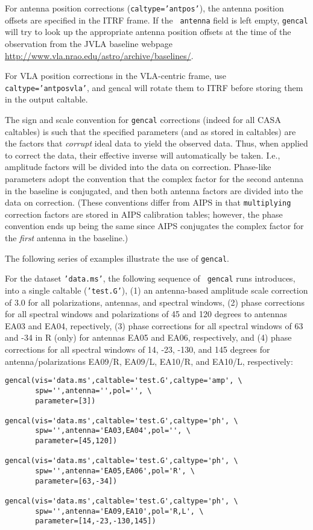 For antenna position corrections ({\tt caltype='antpos'}), the antenna
position offsets are specified in the ITRF frame.  If the {\tt
  antenna} field is left empty, {\tt gencal} will try to look up the
appropriate antenna position offsets at the time of the observation
from the JVLA baseline webpage
\url{http://www.vla.nrao.edu/astro/archive/baselines/}.

For VLA position corrections in the VLA-centric frame, use {\tt
  caltype='antposvla'}, and gencal will rotate them to ITRF before
storing them in the output caltable.

The sign and scale convention for {\tt gencal} corrections (indeed for
all CASA caltables) is such that the specified parameters (and as
stored in caltables) are the factors that {\em corrupt} ideal data to
yield the observed data.  Thus, when applied to correct the data,
their effective inverse will automatically be taken.  I.e., amplitude
factors will be divided into the data on correction.  Phase-like
parameters adopt the convention that the complex factor for the second
antenna in the baseline is conjugated, and then both antenna factors
are divided into the data on correction.  (These conventions differ
from AIPS in that {\tt multiplying} correction factors are stored in
AIPS calibration tables; however, the phase convention ends up being
the same since AIPS conjugates the complex factor for the {\em first}
antenna in the baseline.)

The following series of examples illustrate the use of {\tt gencal}.

For the dataset {\tt 'data.ms'}, the following sequence of {\tt
gencal} runs introduces, into a single caltable ({\tt 'test.G'}), (1)
an antenna-based amplitude scale correction of $3.0$ for all
polarizations, antennas, and spectral windows, (2) phase corrections
for all spectral windows and polarizations of 45 and 120 degrees to
antennas EA03 and EA04, repectively, (3) phase corrections for all
spectral windows of 63 and -34 in R (only) for antennas EA05 and EA06,
respectively, and (4) phase corrections for all spectral windows of
14, -23, -130, and 145 degrees for antenna/polarizations EA09/R,
EA09/L, EA10/R, and EA10/L, respectively:

\small
\begin{verbatim}
gencal(vis='data.ms',caltable='test.G',caltype='amp', \
       spw='',antenna='',pol='', \
       parameter=[3])

gencal(vis='data.ms',caltable='test.G',caltype='ph', \
       spw='',antenna='EA03,EA04',pol='', \
       parameter=[45,120])

gencal(vis='data.ms',caltable='test.G',caltype='ph', \
       spw='',antenna='EA05,EA06',pol='R', \
       parameter=[63,-34])

gencal(vis='data.ms',caltable='test.G',caltype='ph', \
       spw='',antenna='EA09,EA10',pol='R,L', \
       parameter=[14,-23,-130,145])
\end{verbatim}
\normalsize

